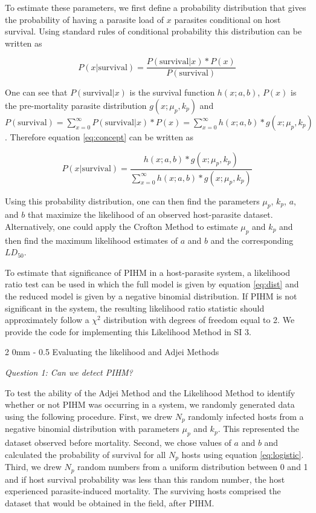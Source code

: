 \documentclass[12pt, a4paper]{article}
\makeatletter
\renewcommand{\subsection}{\@startsection
{subsection}%
{2}%
{0mm}%
{-\baselineskip}%
{0.5\baselineskip}%
{\normalfont\bf}} %
\makeatother
\begin{document}
To estimate these parameters, we first define a probability distribution that gives the probability of having a parasite load of $x$ parasites conditional on host survival.  Using standard rules of conditional probability this distribution can be written as

\begin{equation}
    P(x | \text{survival}) = \dfrac{P(\text{survival} | x) * P(x)}{P(\text{survival})}
    \label{eq:concept}
\end{equation}

One can see that $P(\text{survival} | x)$ is the survival function $h(x; a, b)$, $P(x)$ is the pre-mortality parasite distribution $g(x; \mu_p, k_p)$ and $P(\text{survival}) = \sum_{x=0}^{\infty} P(\text{survival} | x) * P(x) =  \sum_{x=0}^{\infty} h(x; a, b)  * g(x; \mu_p, k_p)$. Therefore equation \ref{eq:concept} can be written as

\begin{equation}
    P(x | \text{survival}) = \dfrac{h(x; a, b)  * g(x; \mu_p, k_p)}{\sum_{x=0}^{\infty} h(x; a, b)  * g(x; \mu_p, k_p)}
    \label{eq:dist}
\end{equation}

Using this probability distribution, one can then find the parameters $\mu_p$, $k_p$, $a$, and $b$ that maximize the likelihood of an observed host-parasite dataset. Alternatively, one could apply the Crofton Method to estimate $\mu_p$ and $k_p$ and then find the maximum likelihood estimates of $a$ and $b$ and the corresponding $LD_{50}$.

To estimate that significance of PIHM in a host-parasite system, a
likelihood ratio test can be used in which the full model is given by equation
\ref{eq:dist} and the reduced model is given by a negative binomial
distribution.  If PIHM is not significant in the system, the resulting likelihood
ratio statistic should approximately follow a $\chi^2$ distribution with degrees of freedom equal to 2.  We provide the code for implementing this Likelihood Method in SI 3.

\subsection{Evaluating the likelihood and Adjei Methods}

\emph{Question 1: Can we detect PIHM?}

To test the ability of the Adjei Method and the Likelihood Method to identify whether or not PIHM was occurring in a system, we randomly generated data using the following procedure.  First, we drew $N_p$ randomly infected hosts from a
negative binomial distribution with parameters $\mu_p$ and $k_p$.  This represented the dataset observed before mortality. Second, we chose values of $a$ and $b$ and calculated the probability of survival
for all $N_p$ hosts using equation \ref{eq:logistic}.  Third, we drew $N_p$ random numbers from a uniform distribution
between 0 and 1 and if host survival probability was less than this random
number, the host experienced parasite-induced mortality.  The surviving
hosts comprised the dataset that would be obtained in the field, after PIHM.
\end{document}
